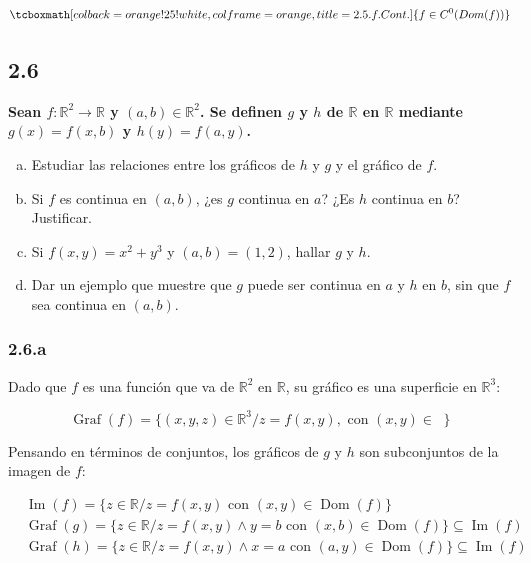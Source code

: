 \documentclass{article}
\renewcommand{\Bbb}{\mathbb}
\begin{document}
\begin{equation}
\tcboxmath[colback=orange!25!white,colframe=orange,title=2.5.f. Cont. ]
{ f \in C^0(\mathop{Dom(f)}) }
\end{equation}

\subsection*{2.6}
\label{subsec:2.6}

\textbf{Sean $f: \Bbb R^2 \rightarrow \Bbb R$ y $(a, b) \in \Bbb R^2$. Se definen $g$ y $h$ de $\Bbb R$ en $\Bbb R$ mediante $g(x) = f(x,b)$ y $h(y) = f(a,y)$.}

\begin{enumerate}[(a)]
\bfseries

\item Estudiar las relaciones entre los gráficos de $h$ y $g$ y el gráfico de $f$.

\item Si $f$ es continua en $(a,b)$, ¿es $g$ continua en $a$? ¿Es $h$ continua en $b$? Justificar.

\item Si $f(x,y) = x^2 + y^3$ y $(a,b) = (1,2)$, hallar $g$ y $h$.

\item Dar un ejemplo que muestre que $g$ puede ser continua en $a$ y $h$ en $b$, sin que $f$ sea continua en $(a,b)$. 

\end{enumerate}

\subsubsection*{2.6.a}
\label{subsubsec:2.6.a}

Dado que $f$ es una función que va de $\Bbb R^2$ en $\Bbb R$, su gráfico es una superficie en $\Bbb R^3$:

\begin{equation}
\mathop{Graf}(f) = \{ (x,y,z) \in \Bbb R^3 / z = f(x,y), \text{ con } (x,y) \in \mathop{\Bbb R^2} \}
\end{equation}

Pensando en términos de conjuntos, los gráficos de $g$ y $h$ son subconjuntos de la imagen de $f$:

\begin{subequations}
\begin{align}
& \mathop{Im}(f) = \{ z \in \Bbb R / z = f(x,y) \text{ con } (x,y) \in \mathop{Dom}(f) \} \\
& \mathop{Graf}(g) = \{ z \in \Bbb R / z = f(x,y) \wedge y = b \text{ con } (x,b) \in \mathop{Dom}(f) \} \subseteq \mathop{Im}(f) \\
& \mathop{Graf}(h) = \{ z \in \Bbb R / z = f(x,y) \wedge x = a \text{ con } (a,y) \in \mathop{Dom}(f) \} \subseteq \mathop{Im}(f)
\end{align}
\end{subequations}
\end{document}
